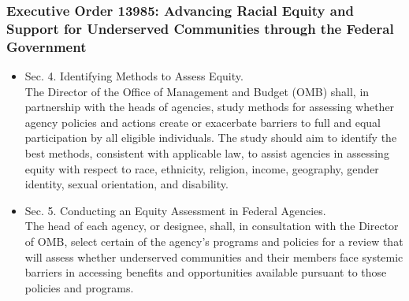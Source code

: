 \documentclass{beamer}
\begin{document}
\begin{frame}

  \frametitle{Executive Order 13985: {\small Advancing Racial Equity and Support for Underserved Communities through the Federal Government}}

  {\small\begin{itemize}
    \item \alert{Sec. 4.  Identifying Methods to Assess Equity}. \\ The
      Director of the Office of Management and Budget (OMB) shall, in
      partnership with the heads of agencies, study methods for
      assessing whether agency policies and actions create or
      exacerbate barriers to full and equal participation by all
      eligible individuals.  The study should aim to identify the best
      methods, consistent with applicable law, to assist agencies in
      assessing equity with respect to race, ethnicity, religion,
      income, geography, gender identity, sexual orientation, and
      disability.

    \vfill
  \item \alert{Sec. 5.  Conducting an Equity Assessment in Federal
      Agencies.} \\ The head of each agency, or designee, shall, in
    consultation with the Director of OMB, select certain of the
    agency's programs and policies for a review that will assess
    whether underserved communities and their members face systemic
    barriers in accessing benefits and opportunities available
    pursuant to those policies and programs.
  \end{itemize}}

\end{frame}
\end{document}
